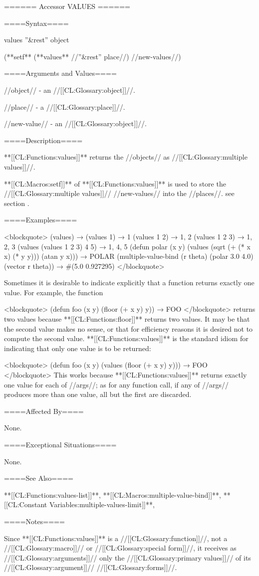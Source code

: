 ====== Accessor VALUES ======

====Syntax====

\DefunWithValues values {''&rest'' object} {}

(**setf** (**values** //''&rest'' place//) //new-values//)

====Arguments and Values====

//object// - an //[[CL:Glossary:object]]//.

//place// - a //[[CL:Glossary:place]]//.

//new-value// - an //[[CL:Glossary:object]]//.

====Description====

**[[CL:Functions:values]]** returns the //objects// as //[[CL:Glossary:multiple values]]//.

**[[CL:Macros:setf]]** of **[[CL:Functions:values]]** is used to store the //[[CL:Glossary:multiple values]]// //new-values// into the //places//. see section {\secref\SETFofVALUES}.

====Examples====

<blockquote> (values) → \novalues (values 1) → 1 (values 1 2) → 1, 2 (values 1 2 3) → 1, 2, 3 (values (values 1 2 3) 4 5) → 1, 4, 5 (defun polar (x y) (values (sqrt (+ (* x x) (* y y))) (atan y x))) → POLAR (multiple-value-bind (r theta) (polar 3.0 4.0) (vector r theta)) → #(5.0 0.927295) </blockquote>

Sometimes it is desirable to indicate explicitly that a function returns exactly one value. For example, the function

<blockquote> (defun foo (x y) (floor (+ x y) y)) → FOO </blockquote> returns two values because **[[CL:Functions:floor]]** returns two values. It may be that the second value makes no sense, or that for efficiency reasons it is desired not to compute the second value. **[[CL:Functions:values]]** is the standard idiom for indicating that only one value is to be returned:

<blockquote> (defun foo (x y) (values (floor (+ x y) y))) → FOO </blockquote> This works because **[[CL:Functions:values]]** returns exactly one value for each of //args//; as for any function call, if any of //args// produces more than one value, all but the first are discarded.

====Affected By====

None.

====Exceptional Situations====

None.

====See Also====

**[[CL:Functions:values-list]]**, **[[CL:Macros:multiple-value-bind]]**, **[[CL:Constant Variables:multiple-values-limit]]**, {\secref\Evaluation}

====Notes====

Since **[[CL:Functions:values]]** is a //[[CL:Glossary:function]]//, not a //[[CL:Glossary:macro]]// or //[[CL:Glossary:special form]]//, it receives as //[[CL:Glossary:arguments]]// only the //[[CL:Glossary:primary values]]// of its //[[CL:Glossary:argument]]// //[[CL:Glossary:forms]]//.

  
